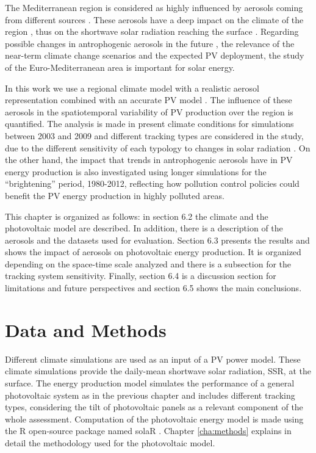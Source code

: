 The Mediterranean region is considered as highly influenced by aerosols coming from different sources \cite*{Lelieveld}. These aerosols have a deep impact on the climate of the region \cite*{Nabat2014, Nabat2015}, thus on the shortwave solar radiation reaching the surface \cite*{Mallet2016}. Regarding possible changes in antrophogenic aerosols in the future \cite*{Gaetani2014, Jimenez-Guerrero2011}, the relevance of the near-term climate change scenarios and the expected PV deployment, the study of the Euro-Mediterranean area is important for solar energy.

In this work we use a regional climate model \cite*{Nabat2014} with a realistic aerosol representation combined with an accurate PV model \cite*{Perpinan2012}. The influence of these aerosols in the spatiotemporal variability of PV production over the region is quantified. The analysis is made in present climate conditions for simulations between 2003 and 2009 and different tracking types are considered in the study, due to the different sensitivity of each typology to changes in solar radiation \cite*{Gutierrez2017}. On the other hand, the impact that trends in antrophogenic aerosols have in PV energy production is also investigated using longer simulations for the ``brightening'' \cite*{Wild2005} period, 1980-2012, reflecting how pollution control policies could benefit the PV energy production in highly polluted areas.

This chapter is organized as follows: in section 6.2 the climate and the photovoltaic model are described. In addition, there is a description of the aerosols and the datasets used for evaluation. Section 6.3 presents the results and shows the impact of aerosols on photovoltaic energy production. It is organized depending on the space-time scale analyzed and there is a subsection for the tracking system sensitivity.  Finally, section 6.4 is a discussion section for limitations and future perspectives and section 6.5 shows the main conclusions.

\section{Data and Methods}

Different climate simulations are used as an input of a PV power model. These climate simulations provide the daily-mean shortwave solar radiation, SSR, at the surface. The energy production model simulates the performance of a general photovoltaic system as in the previous chapter and includes different tracking types, considering the tilt of photovoltaic panels as a relevant component of the whole assessment. Computation of the photovoltaic energy model is made using the R open-source package named solaR \cite*{Perpinan2012}. Chapter \ref{cha:methods} explains in detail the methodology used for the photovoltaic model. 


